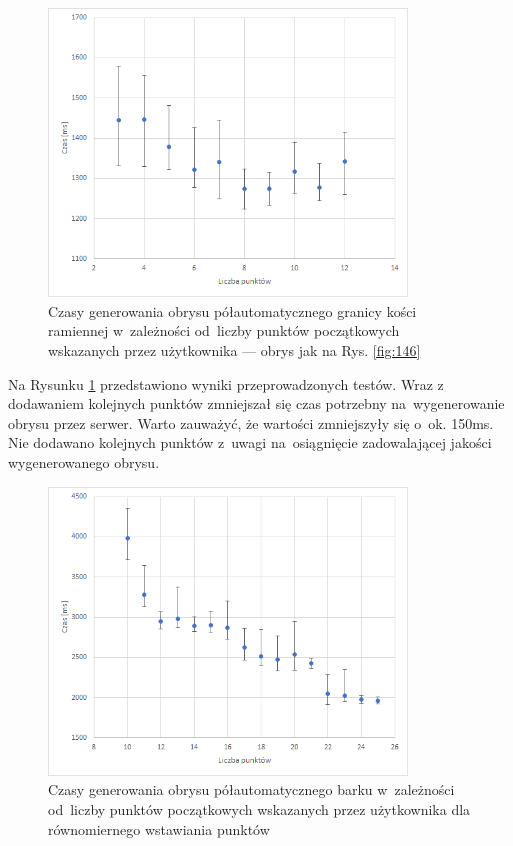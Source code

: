 \documentclass[a4paper,11pt,twoside,openright]{report}
\theoremstyle{definition}
\begin{document}
\begin{figure}[h!]
	\center
	\includegraphics[width=0.85\textwidth]{152}
	\caption{Czasy generowania obrysu półautomatycznego granicy kości ramiennej
	 w~zależności od~liczby punktów
	początkowych wskazanych przez użytkownika --- obrys jak na Rys. \ref{fig:146}}
    	\label{fig:testy_1}
\end{figure}

Na Rysunku \ref{fig:testy_1} przedstawiono wyniki przeprowadzonych testów. Wraz
z dodawaniem kolejnych punktów zmniejszał się czas potrzebny na~wygenerowanie
obrysu przez serwer. Warto zauważyć, że wartości zmniejszyły się o~ok. 150ms.
Nie dodawano kolejnych punktów z~uwagi na~osiągnięcie zadowalającej jakości
wygenerowanego obrysu.

\begin{figure}[h!]
	\center
	\includegraphics[width=0.85\textwidth]{151}
	\caption{Czasy generowania obrysu półautomatycznego barku w~zależności od~liczby punktów
	początkowych wskazanych przez użytkownika dla równomiernego wstawiania punktów
	}
    	\label{fig:testy_2}
\end{figure}
\end{document}
